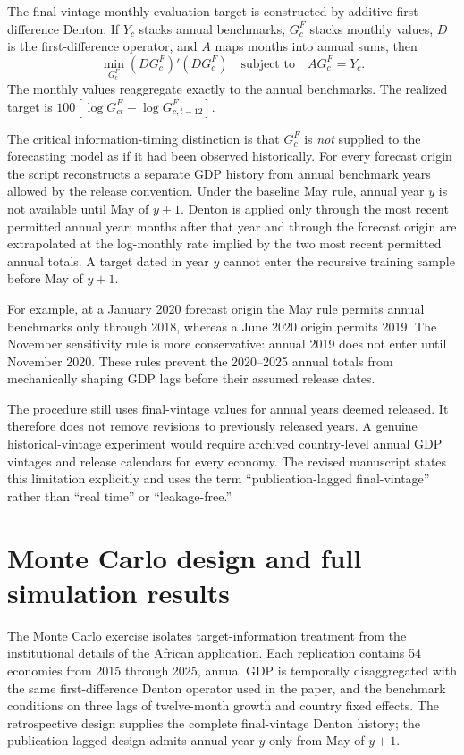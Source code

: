 \documentclass[12pt]{article}
\begin{document}
The final-vintage monthly evaluation target is constructed by additive first-difference Denton. If $Y_c$ stacks annual benchmarks, $G_c^F$ stacks monthly values, $D$ is the first-difference operator, and $A$ maps months into annual sums, then
\[
\min_{G_c^F}(DG_c^F)'(DG_c^F)\quad\text{subject to}\quad AG_c^F=Y_c.
\]
The monthly values reaggregate exactly to the annual benchmarks. The realized target is $100[\log G^F_{ct}-\log G^F_{c,t-12}]$.

The critical information-timing distinction is that $G_c^F$ is \emph{not} supplied to the forecasting model as if it had been observed historically. For every forecast origin the script reconstructs a separate GDP history from annual benchmark years allowed by the release convention. Under the baseline May rule, annual year $y$ is not available until May of $y+1$. Denton is applied only through the most recent permitted annual year; months after that year and through the forecast origin are extrapolated at the log-monthly rate implied by the two most recent permitted annual totals. A target dated in year $y$ cannot enter the recursive training sample before May of $y+1$.

For example, at a January 2020 forecast origin the May rule permits annual benchmarks only through 2018, whereas a June 2020 origin permits 2019. The November sensitivity rule is more conservative: annual 2019 does not enter until November 2020. These rules prevent the 2020--2025 annual totals from mechanically shaping GDP lags before their assumed release dates.

The procedure still uses final-vintage values for annual years deemed released. It therefore does not remove revisions to previously released years. A genuine historical-vintage experiment would require archived country-level annual GDP vintages and release calendars for every economy. The revised manuscript states this limitation explicitly and uses the term ``publication-lagged final-vintage'' rather than ``real time'' or ``leakage-free.''


\section{Monte Carlo design and full simulation results}
The Monte Carlo exercise isolates target-information treatment from the institutional details of the African application. Each replication contains 54 economies from 2015 through 2025, annual GDP is temporally disaggregated with the same first-difference Denton operator used in the paper, and the benchmark conditions on three lags of twelve-month growth and country fixed effects. The retrospective design supplies the complete final-vintage Denton history; the publication-lagged design admits annual year $y$ only from May of $y+1$.
\end{document}
